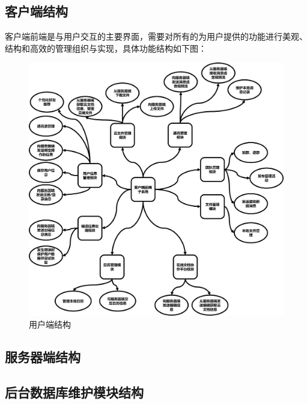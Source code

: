     \subsection{客户端结构}
        客户端前端是与用户交互的主要界面，需要对所有的为用户提供的功能进行美观、
        结构和高效的管理组织与实现，具体功能结构如下图：
        \newpage
        \begin{figure}[h]
            \centering
            \includegraphics[scale=0.25]{OutlineDesign/figures/用户端结构.png}
            \caption{用户端结构}
            \label{fig:server_flow}
        \end{figure}
    \subsection{服务器端结构}
    
    
    \subsection{后台数据库维护模块结构}
    
